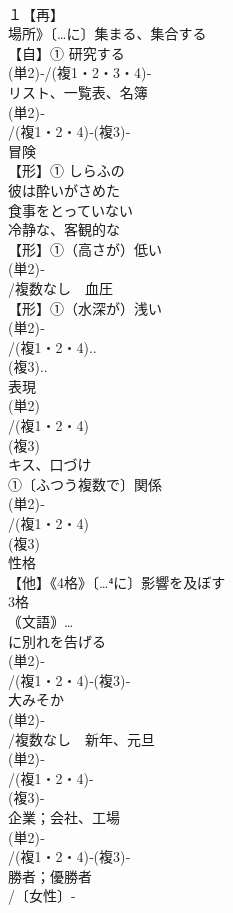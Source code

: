 \documentclass[8pt]{extreport}
\begin{document}
\begin{CJK}{UTF8}{min}
\\	１【再】
\\	場所》〔…に〕集まる、集合する
\\	【自】① 研究する 
\\	(単2)‐/(複1・2・3・4)‐
\\	リスト、一覧表、名簿 
\\	(単2)‐
\\	/(複1・2・4)‐(複3)‐
\\	冒険 
\\	【形】① しらふの 
\\	彼は酔いがさめた 
\\	食事をとっていない　
\\	冷静な、客観的な
\\	【形】①（高さが）低い 
\\	(単2)‐
\\	/複数なし　血圧 
\\	【形】①（水深が）浅い 
\\	(単2)‐
\\	/(複1・2・4)..
\\	(複3)..
\\	表現 
\\	(単2)
\\	/(複1・2・4)
\\	(複3)
\\	キス、口づけ 
\\	①〔ふつう複数で〕関係 
\\	(単2)‐
\\	/(複1・2・4)
\\	(複3)
\\	性格 
\\	【他】《4格》〔…⁴に〕影響を及ぼす 
\\	3格 
\\	｟文語｠…
\\	に別れを告げる
\\	(単2)‐
\\	/(複1・2・4)‐(複3)‐
\\	大みそか
\\	(単2)‐
\\	/複数なし　新年、元旦
\\	(単2)‐
\\	/(複1・2・4)-
\\	(複3)-
\\	企業；会社、工場 
\\	(単2)‐
\\	/(複1・2・4)‐(複3)‐
\\	勝者；優勝者 
\\	/〔女性〕-

\end{CJK}
\end{document}
